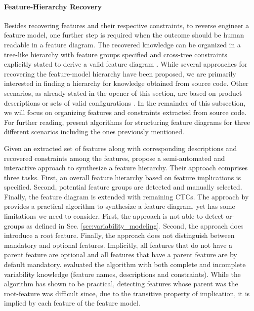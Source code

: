\paragraph{Feature-Hierarchy Recovery} \label{sec:feature_hierarchy}
Besides recovering features and their respective constraints, to reverse
engineer a feature model, one further step is required when the outcome should
be human readable in a feature diagram. The recovered knowledge can be
organized in a tree-like hierarchy with feature groups specified and cross-tree
constraints explicitly stated to derive a valid feature diagram
\citep{kang_feature-oriented_1990}.
While several approaches for recovering the feature-model hierarchy have been
proposed, we are primarily interested in finding a hierarchy for knowledge
obtained from source code. Other scenarios, as already stated in the opener of
this section, are based on product descriptions or sets of valid configurations
\citep{aleti_software_2013,bakar_feature_2015}. In the remainder of this
subsection, we will focus on organizing features and constraints extracted from
source code. For further reading, \cite{andersen_efficient_2012} present algorithms for structuring feature diagrams for three different scenarios including the ones previously mentioned.

Given an extracted set of features along with corresponding descriptions and
recovered constraints among the features, \cite{she_reverse_2011} propose a
semi-automated and interactive approach to synthesize a feature hierarchy.
Their approach comprises three tasks. First, an overall feature hierarchy based
on feature implications is specified. Second, potential feature groups are
detected and manually selected. Finally, the feature diagram is extended with
remaining CTCs. 
The approach by \cite{she_reverse_2011} provides a practical algorithm to synthesize a
feature diagram, yet has some limitations we need to consider. First, the
approach is not able to detect or-groups as defined in Sec. \ref{sec:variability_modeling}.
Second, the approach does introduce a root feature. Finally, the approach does not
distinguish between mandatory and optional features. Implicitly, all features
that do not have a parent feature are optional and all features that have a
parent feature are by default mandatory. \cite{she_reverse_2011} evaluated the
algorithm with both complete and incomplete variability knowledge (feature
names, descriptions and constraints). While the algorithm has shown to be
practical, detecting features whose parent was the root-feature was difficult
since, due to the transitive property of implication, it is implied by each
feature of the feature model.

